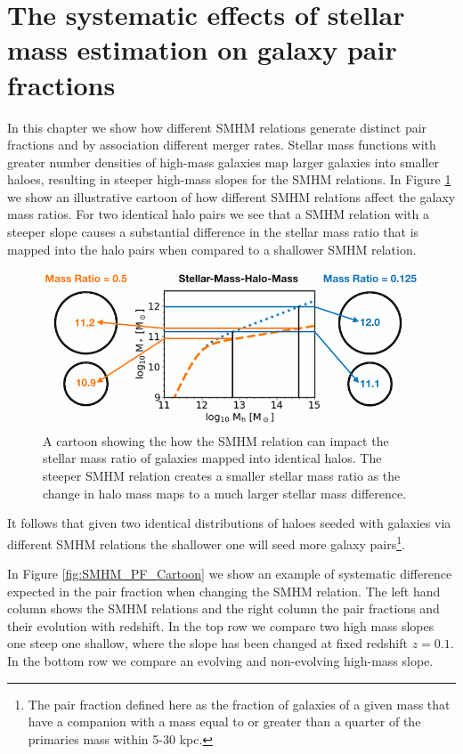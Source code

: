\section{The systematic effects of stellar mass estimation on galaxy pair fractions}


In this chapter we show how different SMHM relations generate distinct pair fractions and by association different merger rates. 
Stellar mass functions with greater number densities of high-mass galaxies map larger galaxies into smaller haloes, resulting in steeper high-mass slopes for the SMHM relations.
In Figure \ref{fig:MassRatioCartoon} we show an illustrative cartoon of how different SMHM relations affect the galaxy mass ratios. 
For two identical halo pairs we see that a SMHM relation with a steeper slope causes a substantial difference in the stellar mass ratio that is mapped into the halo pairs when compared to a shallower SMHM relation. 

\begin{figure}[h]
	\centering
	\includegraphics[width = \linewidth]{Figures/Chapter5/MassRatioCartoon.png}
	\caption{A cartoon showing the how the SMHM relation can impact the stellar mass ratio of galaxies mapped into identical halos. The steeper SMHM relation creates a smaller stellar mass ratio as the change in halo mass maps to a much larger stellar mass difference.}
	\label{fig:MassRatioCartoon}
\end{figure}

It follows that given two identical distributions of haloes seeded with galaxies via different SMHM relations the shallower one will seed more galaxy pairs\footnote{The pair fraction defined here as the fraction of galaxies of a given mass that have a companion with a mass equal to or greater than a quarter of the primaries mass within 5-30 kpc.}.

In Figure \ref{fig:SMHM_PF_Cartoon} we show an example of systematic difference expected in the pair fraction when changing the SMHM relation.
The left hand column shows the SMHM relations and the right column the pair fractions and their evolution with redshift. 
In the top row we compare two high mass slopes one steep one shallow, where the slope has been changed at fixed redshift $z = 0.1$.
In the bottom row we compare an evolving and non-evolving high-mass slope.

